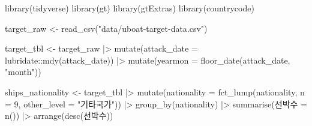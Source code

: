 \documentclass[
  letterpaper,
  chapter,a4paper,showtrims,openright,hidelinks]{oblivoir}
\newenvironment{Shaded}{\begin{snugshade}}{\end{snugshade}}
\newcommand{\AttributeTok}[1]{\textcolor[rgb]{0.40,0.45,0.13}{#1}}
\newcommand{\DecValTok}[1]{\textcolor[rgb]{0.68,0.00,0.00}{#1}}
\newcommand{\FunctionTok}[1]{\textcolor[rgb]{0.28,0.35,0.67}{#1}}
\newcommand{\NormalTok}[1]{\textcolor[rgb]{0.00,0.23,0.31}{#1}}
\newcommand{\OtherTok}[1]{\textcolor[rgb]{0.00,0.23,0.31}{#1}}
\newcommand{\SpecialCharTok}[1]{\textcolor[rgb]{0.37,0.37,0.37}{#1}}
\newcommand{\StringTok}[1]{\textcolor[rgb]{0.13,0.47,0.30}{#1}}
\begin{document}
\begin{Shaded}
\begin{Highlighting}[]
\FunctionTok{library}\NormalTok{(tidyverse)}
\FunctionTok{library}\NormalTok{(gt)}
\FunctionTok{library}\NormalTok{(gtExtras)}
\FunctionTok{library}\NormalTok{(countrycode)}

\NormalTok{target\_raw }\OtherTok{\textless{}{-}} \FunctionTok{read\_csv}\NormalTok{(}\StringTok{"data/uboat{-}target{-}data.csv"}\NormalTok{)}

\NormalTok{target\_tbl }\OtherTok{\textless{}{-}}\NormalTok{ target\_raw }\SpecialCharTok{|\textgreater{}} 
  \FunctionTok{mutate}\NormalTok{(}\AttributeTok{attack\_date =}\NormalTok{ lubridate}\SpecialCharTok{::}\FunctionTok{mdy}\NormalTok{(attack\_date)) }\SpecialCharTok{|\textgreater{}} 
  \FunctionTok{mutate}\NormalTok{(}\AttributeTok{yearmon =} \FunctionTok{floor\_date}\NormalTok{(attack\_date, }\StringTok{"month"}\NormalTok{)) }

\NormalTok{ships\_nationality }\OtherTok{\textless{}{-}}\NormalTok{ target\_tbl }\SpecialCharTok{|\textgreater{}} 
  \FunctionTok{mutate}\NormalTok{(}\AttributeTok{nationality =} \FunctionTok{fct\_lump}\NormalTok{(nationality, }\AttributeTok{n =} \DecValTok{9}\NormalTok{, }\AttributeTok{other\_level =} \StringTok{"기타국가"}\NormalTok{)) }\SpecialCharTok{|\textgreater{}} 
  \FunctionTok{group\_by}\NormalTok{(nationality) }\SpecialCharTok{|\textgreater{}} 
  \FunctionTok{summarise}\NormalTok{(선박수 }\OtherTok{=} \FunctionTok{n}\NormalTok{()) }\SpecialCharTok{|\textgreater{}} 
  \FunctionTok{arrange}\NormalTok{(}\FunctionTok{desc}\NormalTok{(선박수))}


\end{Highlighting}
\end{Shaded}
\end{document}
